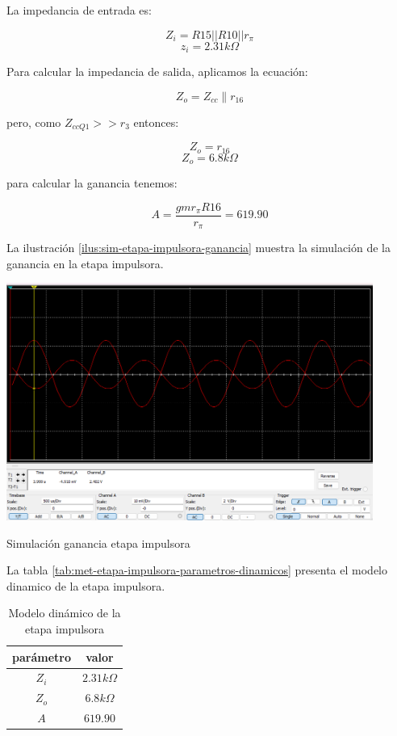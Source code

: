 La impedancia de entrada es:

$$Z_i = R15 || R10 || r_\pi $$
$$z_i = 2.31 k \Omega $$

Para calcular la impedancia de salida, aplicamos la ecuación:

$$ Z_o = Z_{cc} \parallel r_{16}$$

pero, como $Z_{ccQ1} >> r_3$ entonces:

$$ Z_o = r_{16} $$
$$ Z_o = 6.8k\Omega$$

para calcular la ganancia tenemos:

$$A = \frac{gmr_\pi R16}{r_\pi} = 619.90$$

La ilustración \ref{ilus:sim-etapa-impulsora-ganancia} muestra la simulación de la ganancia en la etapa impulsora.

\begin{ilustracion}[ht]
    \centering
    \includegraphics[width=0.9\textwidth]{src/images/p3/etapa-impulsora-ganancia.png}
    \caption{Simulación ganancia etapa impulsora}
    \label{ilus:sim-etapa-impulsora-ganancia}
\end{ilustracion}

La tabla \ref{tab:met-etapa-impulsora-parametros-dinamicos} presenta el modelo dinamico de la etapa impulsora.

\begin{table}[ht]
    \centering
    \begin{tabular}{|c|c|}
        \hline
        parámetro & valor  \\
        \hline
        $Z_i$ & $2.31k\Omega$ \\
        \hline
        $Z_o$ & $6.8k\Omega$ \\
        \hline
        $A$ & $619.90$ \\
        \hline
    \end{tabular}
    \caption{Modelo dinámico de la etapa impulsora}
    \label{tab:met-etapa-impulsora-modelo-dinamico}
\end{table}



